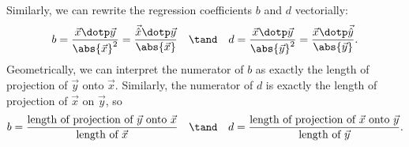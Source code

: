 Similarly, we can rewrite the regression coefficients $b$ and $d$ vectorially: \[b = \frac{\vec x \dotp \vec y}{\abs{\vec x}^2} = \frac{\vec{\hat x} \dotp \vec y}{\abs{\vec x}} \quad \tand \quad d = \frac{\vec x \dotp \vec y}{\abs{\vec y}^2} = \frac{\vec x \dotp \vec{\hat{y}}}{\abs{\vec y}}.\] Geometrically, we can interpret the numerator of $b$ as exactly the length of projection of $\vec y$ onto $\vec x$. Similarly, the numerator of $d$ is exactly the length of projection of $\vec x$ on $\vec y$, so \[b = \frac{\text{length of projection of $\vec y$ onto $\vec x$}}{\text{length of $\vec x$}} \quad \tand \quad d = \frac{\text{length of projection of $\vec x$ onto $\vec y$}}{\text{length of $\vec y$}}.\] %